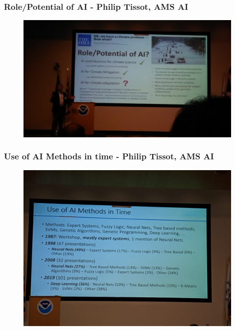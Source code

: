 \documentclass{beamer}
\begin{document}
\begin{frame}
\frametitle{Role/Potential of AI - Philip Tissot, AMS AI}
\begin{figure}
	\includegraphics[width=\linewidth]{figs/P_20190423_105016.jpg}
\end{figure}
\end{frame}

\begin{frame}
\frametitle{Use of AI Methods in time - Philip Tissot, AMS AI}
\begin{figure}
	\includegraphics[width=\linewidth]{figs/IMG_20190423_104750.jpg}
\end{figure}
\end{frame}
\end{document}
